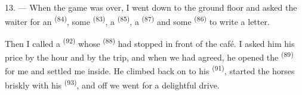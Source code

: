 13. --- When the game was over, I went down to the ground floor and asked
the waiter for an  \textsuperscript{(84)}, some 
\textsuperscript{(83)}, a  \textsuperscript{(85)}, a 
\textsuperscript{(87)} and some  \textsuperscript{(86)} to write a letter.

Then I called a  \textsuperscript{(92)} whose 
\textsuperscript{(88)} had stopped in front of the café. I asked him his price by
the hour and by the trip, and when we had agreed, he opened the
 \textsuperscript{(89)} for me and settled me inside. He climbed
back on to his  \textsuperscript{(91)}, started the horses briskly with
his  \textsuperscript{(93)}, and off we went for a delightful drive.
\VUsaut{6.0mm}
\VUfilet{22mm}
